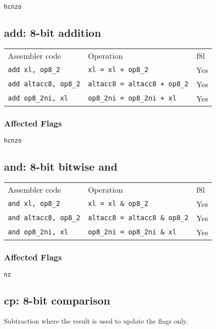 \documentclass{book}
\begin{document}
\texttt{hcnzo}


\subsection{add: 8-bit addition}

\begin{tabular}{l l l}
Assembler code            & Operation                              & f8l \\
\texttt{add xl, op8\_2}      & \texttt{xl = xl + op8\_2}           & Yes \\
\texttt{add altacc8, op8\_2} & \texttt{altacc8 = altacc8 + op8\_2} & Yes \\
\texttt{add op8\_2ni, xl}      & \texttt{op8\_2ni = op8\_2ni + xl} & Yes
\end{tabular}

\subsubsection*{Affected Flags}

\texttt{hcnzo}


\subsection{and: 8-bit bitwise and}

\begin{tabular}{l l l}
Assembler code               & Operation                            & f8l \\
\texttt{and xl, op8\_2}      & \texttt{xl = xl \& op8\_2}           & Yes \\
\texttt{and altacc8, op8\_2} & \texttt{altacc8 = altacc8 \& op8\_2} & Yes \\
\texttt{and op8\_2ni, xl}    & \texttt{op8\_2ni = op8\_2ni \& xl}   & Yes
\end{tabular}

\subsubsection*{Affected Flags}

\texttt{nz}


\subsection{cp: 8-bit comparison}

Subtraction where the result is used to update the flags only.
\end{document}
